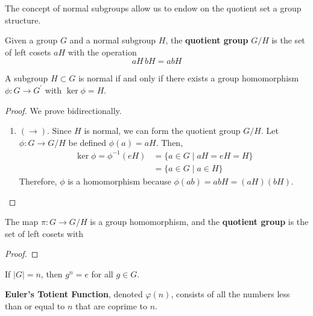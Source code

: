   The concept of normal subgroups allow us to endow on the quotient set a group structure. 

  \begin{definition}
    Given a group $G$ and a normal subgroup $H$, the \textbf{quotient group} $G/H$ is the set of left cosets $aH$ with the operation 
    \begin{equation}
      aH \, bH = abH
    \end{equation}
  \end{definition}

  \begin{lemma} 
    A subgroup $H \subset G$ is normal if and only if there exists a group homomorphism $\phi: G \rightarrow G^\prime$ with $\ker{\phi} = H$. 
  \end{lemma}
  \begin{proof}
    We prove bidirectionally. 
    \begin{enumerate}
      \item $(\rightarrow)$. Since $H$ is normal, we can form the quotient group $G/H$. Let $\phi: G \rightarrow G/H$ be defined $\phi(a) = aH$. Then, 
      \begin{align}
        \ker{\phi} = \phi^{-1}(eH) & = \{a \in G \mid aH = eH = H \} \\
                                   & = \{a \in G \mid a \in H \}
      \end{align}
      Therefore, $\phi$ is a homomorphism because $\phi(ab) = abH = (aH)(bH)$. 
    \end{enumerate}
  \end{proof}

  \begin{theorem}
    The map $\pi: G \rightarrow G/H$ is a group homomorphism, and the \textbf{quotient group} is the set of left cosets with 
  \end{theorem}
  \begin{proof}
    
  \end{proof} 

  \begin{corollary}
    If $|G| = n$, then $g^{n} = e$ for all $g \in G$. 
  \end{corollary}

  \begin{definition}
    \textbf{Euler's Totient Function}, denoted $\varphi(n)$, consists of all the numbers less than or equal to $n$ that are coprime to $n$. 
  \end{definition}

